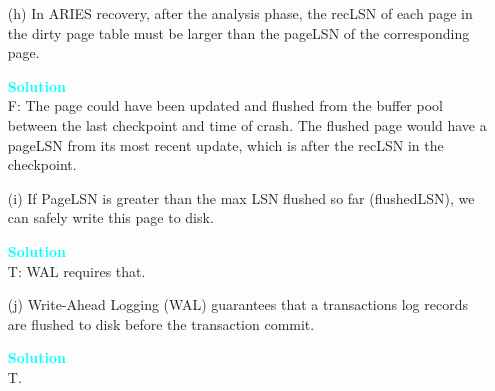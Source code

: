 \documentclass[10pt]{article}
\newenvironment{solution}
    { \begin{mdframed}[backgroundcolor=gray!10] \textcolor{cyan}{\textbf{Solution}} \\}
    {  \end{mdframed}}
\begin{document}
\begin{enumerate}
\begin{itemize}
		            \begin{solution}
			            F: no force policy.
		            \end{solution}
		      \item[(h)] In ARIES recovery, after the analysis phase, the recLSN of each page in the dirty page table must be larger than the pageLSN of the corresponding page.
		            \begin{solution}
			            F: The page could have been updated and flushed from the buffer pool between the last
			            checkpoint and time of crash. The flushed page would have a pageLSN from its most recent update, which is after the recLSN in the checkpoint.
		            \end{solution}
		      \item[(i)] If PageLSN is greater than the max LSN flushed so far (flushedLSN), we can safely write this page to disk.
		            \begin{solution}
			            T: WAL requires that.
		            \end{solution}
		      \item[(j)] Write-Ahead Logging (WAL) guarantees that a transactions log records are flushed to disk before the transaction commit.
		            \begin{solution}
			            T.
		            \end{solution}
	      \end{itemize}


\end{enumerate}
\end{document}
